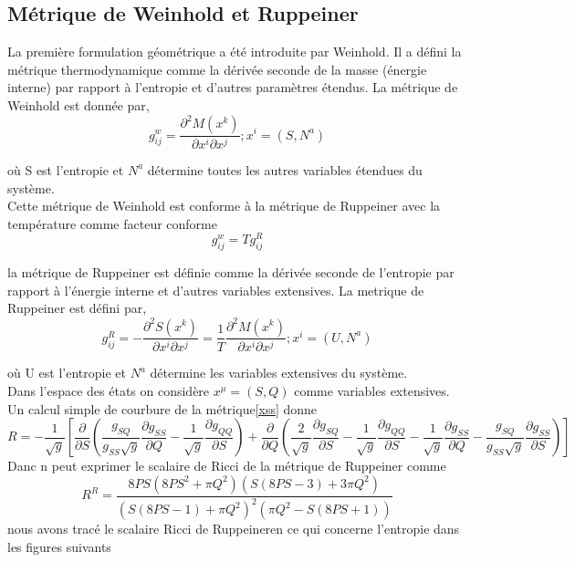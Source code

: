\documentclass[12pt,  a4paper, openright]{report} %
\begin{document}
\subsection{Métrique de Weinhold et Ruppeiner}
La première formulation géométrique a été introduite par Weinhold\cite{52}. Il a défini la métrique thermodynamique
 comme la dérivée seconde de la masse (énergie interne) par rapport à l'entropie et
d'autres paramètres étendus. La métrique de Weinhold est donnée par,
\begin{equation}
g_{ij}^{w}=\dfrac{\partial^{2}M(x^{k})}{\partial x^{i} \partial x^{j} };  x^{i}=(S,N^{a}) 
\end{equation}

où S est l'entropie et $N^{a}$ détermine toutes les autres variables étendues du système.\\
Cette métrique de Weinhold est conforme à la métrique de Ruppeiner 
avec  la température comme facteur conforme
\begin{equation}
g_{ij}^{w}= T g_{ij}^{R}
\end{equation}

la métrique de Ruppeiner \cite{53} est définie comme la dérivée seconde de l’entropie par rapport à l’énergie
interne et d’autres variables extensives. La metrique de Ruppeiner est défini par,
\begin{equation}
\label{xss}
g_{ij}^{R}=-\dfrac{\partial^{2}S(x^{k})}{\partial x^{i} \partial x^{j} }=\dfrac{1}{T}\dfrac{\partial^{2}M(x^{k})}{\partial x^{i} \partial x^{j} };  x^{i}=(U,N^{a}) 
\end{equation}

où U est l'entropie et $N^{a}$ détermine les variables extensives du système.\\
Dans l'espace des états on considère $x^{\mu} = (S, Q)$ comme variables extensives. Un calcul simple de courbure de la métrique\ref{xss} donne
\begin{equation}
R=-\dfrac{1}{\sqrt{g}}\left[\dfrac{\partial}{\partial S}\left( \dfrac{g_{SQ}}{g_{SS}\sqrt{g}}\dfrac{\partial g_{SS}}{\partial Q}-\dfrac{1}{\sqrt{g}}\dfrac{\partial g_{QQ}}{\partial S}\right)  +\dfrac{\partial}{\partial Q}\left( \dfrac{2}{\sqrt{g}}\dfrac{\partial g_{SQ}}{\partial S}-\dfrac{1}{\sqrt{g}}\dfrac{\partial g_{QQ}}{\partial S}-\dfrac{1}{\sqrt{g}}\dfrac{\partial g_{SS}}{\partial Q}-\dfrac{g_{SQ}}{g_{SS}\sqrt{g}}\dfrac{\partial g_{SS}}{\partial S}\right)\right] 
\end{equation}
Danc n peut exprimer le scalaire de Ricci de la  métrique de Ruppeiner  comme
\begin{equation}
R^{R}=\dfrac{8PS(8PS^{2}+\pi Q^{2})(S(8PS-3)+3\pi Q^{2})}{(S(8PS-1)+\pi Q^{2})^{2}(\pi Q^{2}-S(8PS+1))}
\end{equation}
nous avons tracé le scalaire  Ricci  de Ruppeineren ce qui concerne l'entropie dans les figures suivants\\
\end{document}
